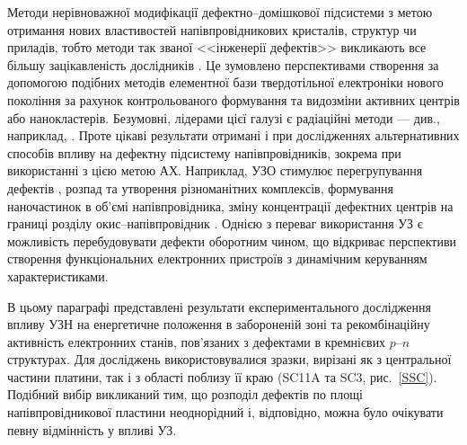 Методи нерівноважної модифікації дефектно--домішкової підсистеми з метою отримання нових властивостей напівпровідникових
кристалів, структур чи приладів, тобто методи так званої <<інженерії дефектів>> викликають все більшу зацікавленість дослідників \cite{Smirnov}.
Це зумовлено перспективами  створення за допомогою подібних методів елементної бази твердотільної
електроніки нового покоління за рахунок контрольованого формування та видозміни активних центрів або нанокластерів.
Безумовні, лідерами цієї галузі є радіаційні методи --- див., наприклад, \cite{Kozlovs,DefImplan}.
Проте цікаві результати отримані і при дослідженнях альтернативних способів впливу на дефектну підсистему напівпровідників,
зокрема при використанні з цією метою АХ.
Наприклад, УЗО стимулює перегрупування дефектів \cite{ZobovFTP2008}, розпад \cite{PodolHivr} та утворення \cite{YOlikh2006TPLr} різноманітних комплексів,
формування наночастинок \cite{Roman:2006JAP} в об'ємі напівпровідника,
зміну концентрації дефектних центрів на границі розділу окис--напівпровідник \cite{Parchinskii2006r}.
Однією з переваг використання УЗ є можливість перебудовувати дефекти оборотним чином, що відкриває
перспективи створення функціональних електронних пристроїв з динамічним керуванням характеристиками.

В цьому параграфі представлені результати експериментального дослідження впливу УЗН на енергетичне положення в забороненій зоні та
рекомбінаційну активність електронних станів, пов'язаних з дефектами в кремнієвих $p$--$n$ структурах.
Для досліджень використовувалися зразки, вирізані як з центральної частини платини, так і з області поблизу її краю (SC11A та SC3, рис.~\ref{SSC}).
Подібний вибір викликаний тим, що розподіл дефектів по площі напівпровідникової пластини неоднорідний і, відповідно, можна було очікувати
певну відмінність у впливі УЗ.

